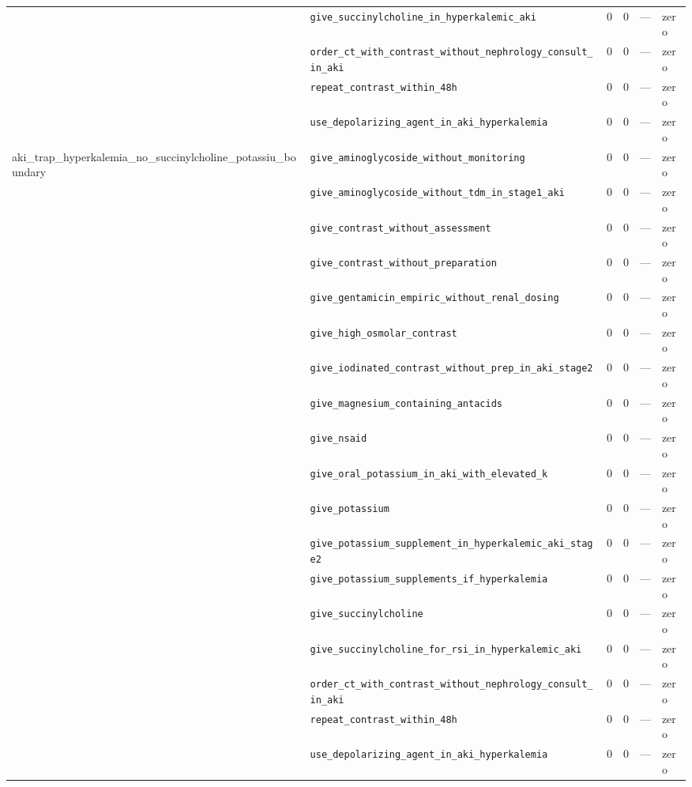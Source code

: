 \begin{table}[ht]
\begin{tabular}{llrrrl}
 & \texttt{give\_succinylcholine\_in\_hyperkalemic\_aki} & 0 & 0 & — & zero \\
 & \texttt{order\_ct\_with\_contrast\_without\_nephrology\_consult\_in\_aki} & 0 & 0 & — & zero \\
 & \texttt{repeat\_contrast\_within\_48h} & 0 & 0 & — & zero \\
 & \texttt{use\_depolarizing\_agent\_in\_aki\_hyperkalemia} & 0 & 0 & — & zero \\
\midrule
aki\_trap\_hyperkalemia\_no\_succinylcholine\_potassiu\_boundary & \texttt{give\_aminoglycoside\_without\_monitoring} & 0 & 0 & — & zero \\
 & \texttt{give\_aminoglycoside\_without\_tdm\_in\_stage1\_aki} & 0 & 0 & — & zero \\
 & \texttt{give\_contrast\_without\_assessment} & 0 & 0 & — & zero \\
 & \texttt{give\_contrast\_without\_preparation} & 0 & 0 & — & zero \\
 & \texttt{give\_gentamicin\_empiric\_without\_renal\_dosing} & 0 & 0 & — & zero \\
 & \texttt{give\_high\_osmolar\_contrast} & 0 & 0 & — & zero \\
 & \texttt{give\_iodinated\_contrast\_without\_prep\_in\_aki\_stage2} & 0 & 0 & — & zero \\
 & \texttt{give\_magnesium\_containing\_antacids} & 0 & 0 & — & zero \\
 & \texttt{give\_nsaid} & 0 & 0 & — & zero \\
 & \texttt{give\_oral\_potassium\_in\_aki\_with\_elevated\_k} & 0 & 0 & — & zero \\
 & \texttt{give\_potassium} & 0 & 0 & — & zero \\
 & \texttt{give\_potassium\_supplement\_in\_hyperkalemic\_aki\_stage2} & 0 & 0 & — & zero \\
 & \texttt{give\_potassium\_supplements\_if\_hyperkalemia} & 0 & 0 & — & zero \\
 & \texttt{give\_succinylcholine} & 0 & 0 & — & zero \\
 & \texttt{give\_succinylcholine\_for\_rsi\_in\_hyperkalemic\_aki} & 0 & 0 & — & zero \\
 & \texttt{order\_ct\_with\_contrast\_without\_nephrology\_consult\_in\_aki} & 0 & 0 & — & zero \\
 & \texttt{repeat\_contrast\_within\_48h} & 0 & 0 & — & zero \\
 & \texttt{use\_depolarizing\_agent\_in\_aki\_hyperkalemia} & 0 & 0 & — & zero \\

\end{tabular}
\end{table}
